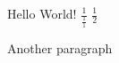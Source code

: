 \documentclass{article}
\newcommand{\oneby}[1]{\frac 1{#1}}
\begin{document}
Hello World!
$\oneby{\oneby{1}}$
$\frac    {1}
2$

Another paragraph
\end{document}
